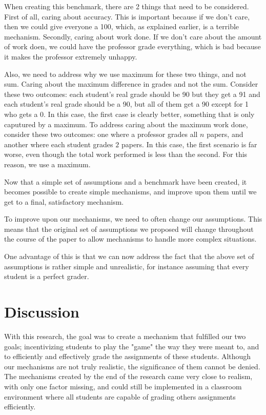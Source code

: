 \documentclass[12pt, Arial]{article}
\begin{document}
When creating this benchmark, there are 2 things that need to be considered. First of all, caring about accuracy. This is important because if we don't care, then we could give everyone a 100, which, as explained earlier, is a terrible mechanism. Secondly, caring about work done. If we don't care about the amount of work doen, we could have the professor grade everything, which is bad because it makes the professor extremely unhappy. 

Also, we need to address why we use maximum for these two things, and not sum. Caring about the maximum difference in grades and not the sum. Consider these two outcomes: each student's real grade should be 90 but they get a 91 and each student's real grade should be a 90, but all of them get a 90 except for 1 who gets a 0. In this case, the first case is clearly better, something that is only caputured by a maximum. To address caring about the maximum work done, consider these two outcomes: one where a professor grades all $n$ papers, and another where each student grades $2$ papers. In this case, the first scenario is far worse, even though the total work performed is less than the second. For this reason, we use a maximum.




Now that a simple set of assumptions and a benchmark have been created, it becomes possible to create simple mechanisms, and improve upon them until we get to a final, satisfactory mechanism.

To improve upon our mechanisms, we need to often change our assumptions. This means that the original set of assumptions we proposed will change throughout the course of the paper to allow mechanisms to handle more complex situations.

One advantage of this is that we can now address the fact that the above set of assumptions is rather simple and unrealistic, for instance assuming that every student is a perfect grader.




\section{Discussion}
With this research, the goal was to create a mechanism that fulfilled our two goals; incentivizing students to play the "game" the way they were meant to, and to efficiently and effectively grade the assignments of these students. Although our mechanisms are not truly realistic, the significance of them cannot be denied. The mechanisms created by the end of the research came very close to realism, with only one factor missing, and could still be implemented in a classroom environment where all students are capable of grading others assignments efficiently.
\end{document}
